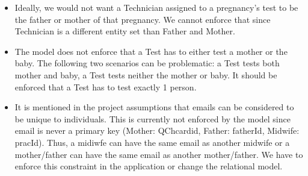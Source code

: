 \documentclass[10pt, letterpaper]{article}
\begin{document}
\begin{itemize}
    \item Ideally, we would not want a Technician assigned to a pregnancy's test to be the father or mother of that pregnancy. We cannot enforce that since Technician is a different entity set than Father and Mother.
    \item The model does not enforce that a Test has to either test a mother or the baby. The following two scenarios can be problematic: a Test tests both mother and baby, a Test tests neither the mother or baby. It should be enforced that a Test has to test exactly 1 person.
    \item It is mentioned in the project assumptions that emails can be considered to be unique to individuals. This is currently not enforced by the model since email is never a primary key (Mother: QChcardid, Father: fatherId, Midwife: pracId). Thus, a midiwfe can have the same email as another midwife or a mother/father can have the same email as another mother/father. We have to enforce this constraint in the application or change the relational model.
\end{itemize}
\end{document}
